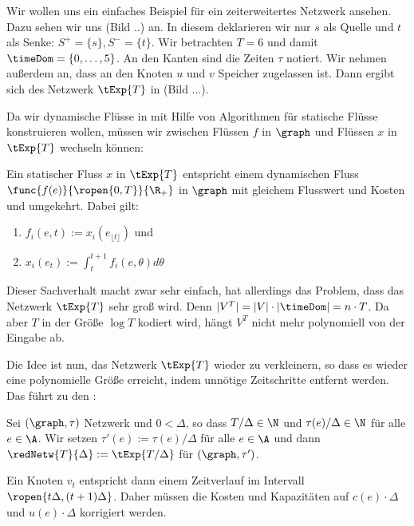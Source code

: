 \begin{example}
    Wir wollen uns ein einfaches Beispiel für ein zeiterweitertes Netzwerk 
    ansehen. Dazu sehen wir uns (Bild ..) an. In diesem deklarieren wir
    nur $s$ als Quelle und $t$ als Senke: $S^+ = \{s\}, S^- = \{t\}$.
    Wir betrachten $T = 6$ und damit $\timeDom = \{0, \ldots, 5\}$. An den
    Kanten sind die Zeiten $\tau$ notiert. Wir nehmen außerdem an, dass
    an den Knoten $u$ und $v$ Speicher zugelassen ist. Dann ergibt sich
    des Netzwerk $\tExp{T}$ in (Bild ...).
\end{example}

Da wir dynamische Flüsse in mit Hilfe von Algorithmen für statische Flüsse
konstruieren wollen, müssen wir zwischen Flüssen $f$ in $\graph$ und
Flüssen $x$ in $\tExp{T}$ wechseln können:

\begin{lemma}\label{lem:static_dyn_conv}
    Ein statischer Fluss $x$ in $\tExp{T}$ entspricht einem dynamischen Fluss
    $\func{f(e)}{\ropen{0,T}}{\R_+}$ in $\graph$ mit gleichem Flusswert und Kosten
    und umgekehrt. Dabei gilt:
    \begin{enumerate}
        \item $f_i(e,t) := x_i(e_{\lfloor t \rfloor})$ und
        \item $x_i(e_t) := \int_t^{t+1} f_i(e, \theta) d\theta$
    \end{enumerate}
\end{lemma}

Dieser Sachverhalt macht zwar sehr einfach, hat allerdings das Problem, dass das
Netzwerk $\tExp{T}$ sehr groß wird. Denn $|V^T| = |V| \cdot |\timeDom| = n \cdot T$.
Da aber $T$ in der Größe $\log T$ kodiert wird, hängt $V^T$ nicht mehr polynomiell
von der Eingabe ab.

Die Idee ist nun, das Netzwerk $\tExp{T}$ wieder zu verkleinern, so dass es wieder
eine polynomielle Größe erreicht, indem unnötige Zeitschritte entfernt werden.
Das führt zu den :

\begin{definition}
    Sei $(\graph, \tau)$ Netzwerk und $0 < \Delta$, so dass $T/\Delta \in \N$
    und $\tau(e)/\Delta \in \N$ für alle $e \in \A$. Wir setzen
    $\tau'(e) := \tau(e)/\Delta$ für alle $e \in \A$
    und dann $\redNetw{T}{\Delta} := \tExp{T/\Delta}$ für $(\graph, \tau')$.
    
    Ein Knoten $v_t$ entspricht dann einem Zeitverlauf im Intervall
    $\ropen{t \Delta, (t+1) \Delta}$. Daher müssen die Kosten und Kapazitäten
    auf $c(e) \cdot \Delta$ und $u(e) \cdot \Delta$ korrigiert werden.
\end{definition}

